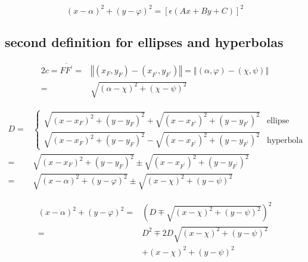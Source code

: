 \documentclass[
]{book}
\theoremstyle{definition}
\theoremstyle{definition}
\theoremstyle{definition}
\theoremstyle{definition}
\theoremstyle{remark}
\begin{document}
\[
\left(x-\alpha\right)^{2}+\left(y-\varphi\right)^{2}=\left[\epsilon\left(Ax+By+C\right)\right]^{2}
\]

\hypertarget{second-definition-for-ellipses-and-hyperbolas}{%
\subsection{second definition for ellipses and hyperbolas}\label{second-definition-for-ellipses-and-hyperbolas}}

\[
\begin{aligned}
2c=\overline{FF^{\prime}}= & \left\Vert \left(x_{{\scriptscriptstyle F}},y_{{\scriptscriptstyle F}}\right)-\left(x_{{\scriptscriptstyle F^{\prime}}},y_{{\scriptscriptstyle F^{\prime}}}\right)\right\Vert =\left\Vert \left(\alpha,\varphi\right)-\left(\chi,\psi\right)\right\Vert \\
= & \sqrt{\left(\alpha-\chi\right)^{2}+\left(\chi-\psi\right)^{2}}
\end{aligned}
\]

\[
\begin{aligned}
D= & \begin{cases}
\sqrt{\left(x-x_{{\scriptscriptstyle F}}\right)^{2}+\left(y-y_{{\scriptscriptstyle F}}\right)^{2}}+\sqrt{\left(x-x_{{\scriptscriptstyle F^{\prime}}}\right)^{2}+\left(y-y_{{\scriptscriptstyle F^{\prime}}}\right)^{2}} & \text{ellipse}\\
\sqrt{\left(x-x_{{\scriptscriptstyle F}}\right)^{2}+\left(y-y_{{\scriptscriptstyle F}}\right)^{2}}-\sqrt{\left(x-x_{{\scriptscriptstyle F^{\prime}}}\right)^{2}+\left(y-y_{{\scriptscriptstyle F^{\prime}}}\right)^{2}} & \text{hyperbola}
\end{cases}\\
= & \sqrt{\left(x-x_{{\scriptscriptstyle F}}\right)^{2}+\left(y-y_{{\scriptscriptstyle F}}\right)^{2}}\pm\sqrt{\left(x-x_{{\scriptscriptstyle F^{\prime}}}\right)^{2}+\left(y-y_{{\scriptscriptstyle F^{\prime}}}\right)^{2}}\\
= & \sqrt{\left(x-\alpha\right)^{2}+\left(y-\varphi\right)^{2}}\pm\sqrt{\left(x-\chi\right)^{2}+\left(y-\psi\right)^{2}}
\end{aligned}
\]

\[
\begin{aligned}
\left(x-\alpha\right)^{2}+\left(y-\varphi\right)^{2}= & \left(D\mp\sqrt{\left(x-\chi\right)^{2}+\left(y-\psi\right)^{2}}\right)^{2}\\
= & D^{2}\mp2D\sqrt{\left(x-\chi\right)^{2}+\left(y-\psi\right)^{2}}\\
 & +\left(x-\chi\right)^{2}+\left(y-\psi\right)^{2}
\end{aligned}
\]
\end{document}

